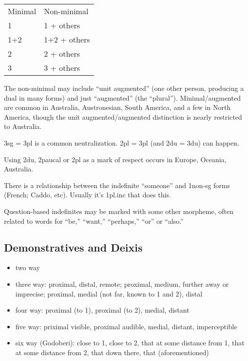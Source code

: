 \documentclass[11pt]{article}
\newenvironment{grammarlist}%
 {\begin{itemize}\addtolength{\itemsep}{-0.5\baselineskip}\ignorespaces}%
 {\end{itemize}\ignorespacesafterend}
\begin{document}
\begin{center}
\begin{tabular}{ll}
Minimal & Non-minimal \\
1  & 1 + others \\
1+2 & 1+2 + others \\
2 & 2 + others \\
3 & 3 + others 
\end{tabular}
\end{center}

\noindent The non-minimal may include ``unit augmented'' (one other
person, producing a dual in many forms) and just ``augmented'' (the
``plural'').  Minimal/augmented are common in Australia, Austronesian,
South America, and a few in North America, though the unit
augmented/augmented distinction is nearly restricted to Australia.

3sg = 3pl is a common neutralization.  2pl = 3pl (and 2du = 3du) can
happen.

Using 2du, 2paucal or 2pl as a mark of respect occurs in Europe,
Oceania, Australia.

There is a relationship between the indefinite ``someone'' and
1non-sg forms (French; Caddo, etc).  Usually it's 1pl.inc that does
this. 

Question-based indefinites may be marked with some other morpheme,
often related to words for ``be,'' ``want,'' ``perhaps,'' ``or'' or
``also.''


\subsection{Demonstratives and Deixis}

\begin{grammarlist}
  \item two way
  \item three way: proximal, distal, remote; proximal, medium, further
    away or imprecise; proximal, medial (not far, known to 1 and 2),
    distal
  \item four way: proximal (to 1), proximal (to 2), medial, distant
  \item five way: priximal visible, proximal audible, medial, distant,
    imperceptible
  \item six way (Godoberi): close to 1, close to 2, that at some
    distance from 1, that at some distance from 2, that down there,
    that (aforementioned)
\end{grammarlist}
\end{document}

